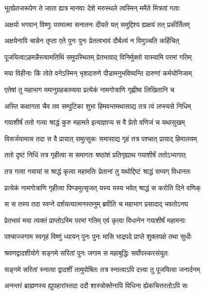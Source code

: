 \twolineshloka
{भूतप्रेतजरूपेण ते जाता ह्यत्र मानवाः}
{देशे मरुस्थले त्वस्मिन् ममैते मित्रतां गताः}%

\twolineshloka
{अक्षयो भगवान् विष्णुः परमात्मा सनातनः}
{दीयते यत् समुद्दिश्य ह्यक्षयं तत् प्रकीर्तितम्}%

\twolineshloka
{अक्षयेनापि चान्नेन तृप्ता एते पुनः पुनः}
{प्रेतत्वभावं दौर्बल्यं न विमुञ्चति कर्हिचित्}%

\twolineshloka
{पूजयित्वाऽहमन्नैस्त्वामतिथिं समुपस्थितम्}
{प्रेतभावाद् विनिर्मुक्तो यास्यामि परमां गतिम्}%

\twolineshloka
{मया विहीनाः किं त्वेते वनेऽस्मिन् भृशदारुणे}
{पीडामनुभविष्यन्ति दारुणां कर्मयोनिजाम्}%

\twolineshloka
{एतेषां तु महाभाग ममानुग्रहकाम्यया}
{प्रत्येकं नामगोत्राणि गृह्णीष्व लिखितानि च}%

\twolineshloka
{अस्ति कक्षागता चैव तव सम्पुटिका शुभा}
{हिमवन्तमथासाद्य तत्र त्वं लप्स्यसे निधिम्}%

\twolineshloka
{गयाशीर्षं ततो गत्वा श्राद्धं कुरु महामते}
{इत्याज्ञाप्य स वै प्रेतो वणिजं च यथासुखम्}%

\twolineshloka
{विसर्जयामास तदा स वै प्रायात् समुत्सुकः}
{समासाद्य गृहं तत्र पश्चात् प्रायाद् हिमालयम्}%

\twolineshloka
{ततो दृष्टं निधिं तत्र गृहीत्वा स समागतः}
{षष्ठांशं प्रतिगृह्याथ गयाशीर्षं ततोऽभ्यगात्}%

\twolineshloka
{तत्र गत्वा गयायां स श्राद्धं कृत्वा महामतिः}
{प्रेतानां तु यथोद्दिष्टं श्राद्धं सम्यग् विधानतः}%

\twolineshloka
{प्रत्येकं नामगोत्राणि गृहीत्वा पिण्डमुत्सृजत्}
{यस्य यस्य भवेत् श्राद्धं स करोति दिने वणिक्}%

\twolineshloka
{स स तस्य तदा स्वप्ने दर्शयत्यात्मनस्तनुम्}
{ब्रवीति च महाभाग प्रसादाद् भवतोऽनघ}%

\twolineshloka
{प्रेतभावं मया त्यक्तं प्राप्तोऽस्मि परमां गतिम्}
{एवं कृत्वा विधानेन गयाशीर्षं महामनाः}%

\twolineshloka
{पश्चाज्जगाम स्वगृहं विष्णुं ध्यायन् पुनः पुनः}
{मासि भाद्रपदे प्राप्ते शुक्लपक्षे तथा सुधीः}%

\twolineshloka
{श्रवणद्वादशीयोगे सङ्गमे सरितां पुनः}
{जगाम स महाबुद्धिः सर्वोपस्करसंयुतः}%

\twolineshloka
{सङ्गमे सरितां स्नात्वा द्वादशीं तामुपोषितः}
{तत्र स्नात्वाऽपि दत्त्वा तु पूजयित्वा जनार्दनम्}%

\twolineshloka
{अनन्तरं ब्राह्मणस्य ह्युपहारांस्तदा ददौ}
{शास्त्रोक्तेनापि विधिना ह्येकचित्तरतोऽपि सः}%

